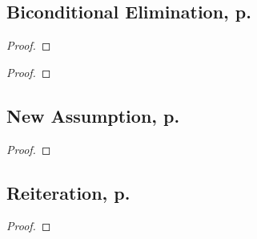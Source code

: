 \begin{multicols}{2}
\subsection{Biconditional Elimination, p.\ \pageref{bielim}}
\begin{proof}
	 
\end{proof}
\begin{proof}
	 
\end{proof}

\subsection{New Assumption, p.\ \pageref{newass}}
\begin{proof}
	\open
\end{proof}

\subsection{Reiteration, p.\ \pageref{reit}}
\begin{proof}
	\have[\ ]{}{\vdots}
	 
\end{proof}

\end{multicols}



